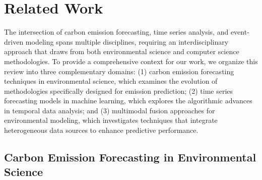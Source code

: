 \section{Related Work}
\label{sec:Related_Work}

The intersection of carbon emission forecasting, time series analysis, and event-driven modeling spans multiple disciplines, requiring an interdisciplinary approach that draws from both environmental science and computer science methodologies.   To provide a comprehensive context for our work, we organize this review into three complementary domains: (1) carbon emission forecasting techniques in environmental science, which examines the evolution of methodologies specifically designed for emission prediction;   (2) time series forecasting models in machine learning, which explores the algorithmic advances in temporal data analysis;   and (3) multimodal fusion approaches for environmental modeling, which investigates techniques that integrate heterogeneous data sources to enhance predictive performance.

\subsection{Carbon Emission Forecasting in Environmental Science}
\label{subsec:carbon_forecasting}

